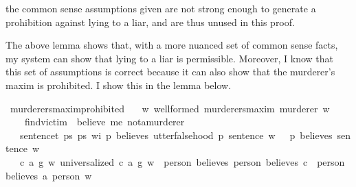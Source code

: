 \begin{isabellebody}
{the common sense assumptions given are not strong enough to generate a prohibition against lying to a liar,
and are thus unused in this proof.%
}%
\endisatagproof
{\isafoldproof}%
%
\isadelimproof
%
\endisadelimproof
%
\begin{isamarkuptext}%
The above lemma shows that, with a more nuanced set of common sense facts, my system can show that 
lying to a liar is permissible. Moreover, I know that this set of assumptions is correct because it 
can also show that the murderer's maxim is prohibited. I show this in the lemma below.%
\end{isamarkuptext}\isamarkuptrue%
\isamarkupfalse%
\ murderers{\isacharunderscore}maxim{\isacharunderscore}prohibited{}{\isacharcolon}\isanewline
\ \ \ {\isachardoublequoteopen}{\isasymforall}w{\isachardot}\ well{\isacharunderscore}formed\ murderers{\isacharunderscore}maxim\ murderer\ w{\isachardoublequoteclose}\isanewline
%
\isanewline
\ \ \ {\isachardoublequoteopen}{\isasymTurnstile}\ {\isacharparenleft}find{\isacharunderscore}victim\ \isactrlbold {\isasymrightarrow}\ {\isacharparenleft}believe\ me\ not{\isacharunderscore}a{\isacharunderscore}murderer{\isacharparenright}{\isacharparenright}{\isachardoublequoteclose}\isanewline
%
\isanewline
\ \ \ {\isachardoublequoteopen}{\isasymforall}sentence{\isacharcolon}{\isacharcolon}t{\isachardot}\ {\isasymforall}p{}{\isacharcolon}{\isacharcolon}s{\isachardot}\ {\isasymforall}p{}{\isacharcolon}{\isacharcolon}s{\isachardot}\ {\isasymforall}w{\isacharcolon}{\isacharcolon}i{\isachardot}\ {\isacharparenleft}{\isacharparenleft}p{}\ believes\ {\isacharparenleft}utter{\isacharunderscore}falsehood\ p{}\ sentence{\isacharparenright}{\isacharparenright}\ w{\isacharparenright}\ {\isasymlongrightarrow}\ {\isacharparenleft}{\isasymnot}\ {\isacharparenleft}p{}\ believes\ sentence{\isacharparenright}\ w{\isacharparenright}{\isachardoublequoteclose}\isanewline
%
\isanewline
\ \ \ {\isachardoublequoteopen}{\isasymforall}c\ a\ g\ w{\isachardot}\ {\isacharparenleft}universalized\ {\isacharparenleft}c{\isacharcomma}\ a{\isacharcomma}\ g{\isacharparenright}\ w{\isacharparenright}\ {\isasymlongrightarrow}\ {\isacharparenleft}{\isacharparenleft}person{}\ believes\ {\isacharparenleft}person{}\ believes\ c{\isacharparenright}{\isacharparenright}\ \isactrlbold {\isasymrightarrow}\ {\isacharparenleft}person{}\ believes\ {\isacharparenleft}a\ person{}{\isacharparenright}{\isacharparenright}{\isacharparenright}\ w{\isachardoublequoteclose}\isanewline

\end{isabellebody}
